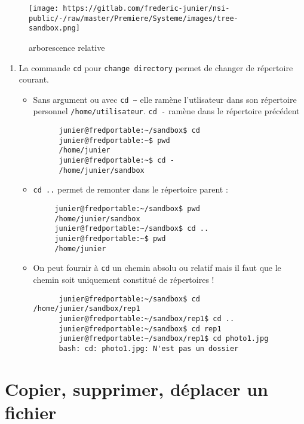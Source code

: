 \documentclass[
  11pt,
]{article}
\newcounter{def}
\begin{document}
\begin{figure}
\centering
\texttt{[image: https://gitlab.com/frederic-junier/nsi-public/-/raw/master/Premiere/Systeme/images/tree-sandbox.png]}
\caption{arborescence relative}
\end{figure}

\begin{enumerate}
\def\labelenumi{\arabic{enumi}.}
\setcounter{enumi}{3}
\item
  La commande \texttt{cd} pour \texttt{change\ directory} permet de
  changer de répertoire courant.

  \begin{itemize}
  \item
    Sans argument ou avec \texttt{cd\ \textasciitilde{}} elle ramène
    l'utlisateur dans son répertoire personnel
    \texttt{/home/utilisateur}. \texttt{cd\ -} ramène dans le répertoire
    précédent

\begin{verbatim}
      junier@fredportable:~/sandbox$ cd
      junier@fredportable:~$ pwd
      /home/junier
      junier@fredportable:~$ cd -
      /home/junier/sandbox
\end{verbatim}
  \item
    \texttt{cd\ ..} permet de remonter dans le répertoire parent :

\begin{verbatim}
     junier@fredportable:~/sandbox$ pwd
     /home/junier/sandbox
     junier@fredportable:~/sandbox$ cd ..
     junier@fredportable:~$ pwd
     /home/junier
\end{verbatim}
  \item
    On peut fournir à \texttt{cd} un chemin absolu ou relatif mais il
    faut que le chemin soit uniquement constitué de répertoires !

\begin{verbatim}
      junier@fredportable:~/sandbox$ cd /home/junier/sandbox/rep1
      junier@fredportable:~/sandbox/rep1$ cd ..
      junier@fredportable:~/sandbox$ cd rep1
      junier@fredportable:~/sandbox/rep1$ cd photo1.jpg
      bash: cd: photo1.jpg: N'est pas un dossier  
\end{verbatim}
  \end{itemize}
\end{enumerate}

\hypertarget{copier-supprimer-duxe9placer-un-fichier}{%
\section{Copier, supprimer, déplacer un
fichier}\label{copier-supprimer-duxe9placer-un-fichier}}
\end{document}
